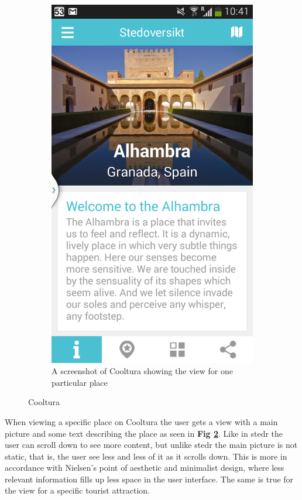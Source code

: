 \begin{figure}
\begin{subfigure}[h]{0.4\textwidth}
		\includegraphics[width=\textwidth]{fig/cooltura_screenshot2}
		\caption{A screenshot of Cooltura showing the view for one particular place}
		\label{Fig:cooltura_screenshot2}
	\end{subfigure}
	\caption{Cooltura}
\end{figure}

When viewing a specific place on Cooltura the user gets a view with a main picture and some text describing the place as seen in \textbf{Fig \ref{Fig:cooltura_screenshot2}}. Like in stedr the user can scroll down to see more content, but unlike stedr the main picture is not static, that is, the user see less and less of it as it scrolls down. This is more in accordance with Nielsen’s point of aesthetic and minimalist design, where less relevant information fills up less space in the user interface. The same is true for the view for a specific tourist attraction. \newline

